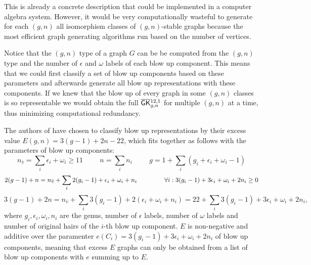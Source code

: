 This is already a concrete description that could be implemented in a computer algebra system. However, it would be very computationally wasteful to generate for each $(g,n)$ all isomorphism classes of $(g,n)$-stable graphs because the most efficient graph generating algorithms run based on the number of vertices.

Notice that the $(g,n)$ type of a graph $G$ can be be computed from the $(g,n)$ type and the number of $\epsilon$ and $\omega$ labels of each blow up component. This means that we could first classify a set of blow up components based on these parameters and afterwards generate all blow up representations with these components. If we knew that the blow up of every graph in some $(g,n)$ classes is so representable we would obtain the full $\bGK_{g,n}^{12,1}$ for multiple $(g,n)$ at a time, thus minimizing computational redundancy.

The authors of \cite[Section 3.2]{CLPW2} have chosen to classify blow up representations by their excess value $E(g,n) = 3(g-1)+2n-22$, which fits together as follows with the parameters of blow up components:
\[ n_{\bar{v}} = \sum_i\epsilon_i+\omega_i \geq 11 \hspace{1cm} n = \sum_i n_i \hspace{1cm} g = 1+\sum_i(g_i+\epsilon_i+\omega_i-1) \]
\[ 2(g-1)+n = n_{\bar{v}}+\sum_i 2(g_i-1)+\epsilon_i+\omega_i+n_i \hspace{1.5cm}  \forall i: 3(g_i-1)+3\epsilon_i+\omega_i+2n_i \geq 0\]
\[ 3(g-1)+2n = n_{\bar{v}}+\sum_i 3(g_i-1)+2(\epsilon_i+\omega_i+n_i) = 22+\sum_i 3(g_i-1)+3\epsilon_i+\omega_i+2n_i,
\]
where $g_i,\epsilon_i,\omega_i,n_i$ are the genus, number of $\epsilon$ labels, number of $\omega$ labels and number of original hairs of the $i$-th blow up component. $E$ is non-negative and additive over the paramenter $e(C_i)=3(g_i-1)+3\epsilon_i+\omega_i+2n_i$ of blow up components, meaning that excess $E$ graphs can only be obtained from a list of blow up components with $e$ summing up to $E$.

